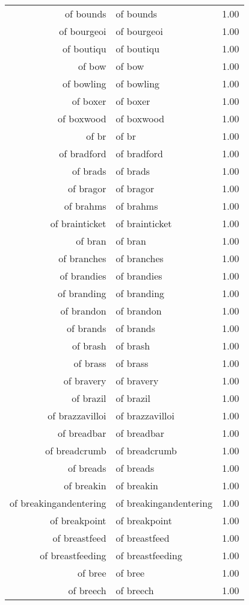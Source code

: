 \begin{table}[ht]
\begin{tabular}{rlr}
  of bounds & of bounds & 1.00 \\ 
  of bourgeoi & of bourgeoi & 1.00 \\ 
  of boutiqu & of boutiqu & 1.00 \\ 
  of bow & of bow & 1.00 \\ 
  of bowling & of bowling & 1.00 \\ 
  of boxer & of boxer & 1.00 \\ 
  of boxwood & of boxwood & 1.00 \\ 
  of br & of br & 1.00 \\ 
  of bradford & of bradford & 1.00 \\ 
  of brads & of brads & 1.00 \\ 
  of bragor & of bragor & 1.00 \\ 
  of brahms & of brahms & 1.00 \\ 
  of brainticket & of brainticket & 1.00 \\ 
  of bran & of bran & 1.00 \\ 
  of branches & of branches & 1.00 \\ 
  of brandies & of brandies & 1.00 \\ 
  of branding & of branding & 1.00 \\ 
  of brandon & of brandon & 1.00 \\ 
  of brands & of brands & 1.00 \\ 
  of brash & of brash & 1.00 \\ 
  of brass & of brass & 1.00 \\ 
  of bravery & of bravery & 1.00 \\ 
  of brazil & of brazil & 1.00 \\ 
  of brazzavilloi & of brazzavilloi & 1.00 \\ 
  of breadbar & of breadbar & 1.00 \\ 
  of breadcrumb & of breadcrumb & 1.00 \\ 
  of breads & of breads & 1.00 \\ 
  of breakin & of breakin & 1.00 \\ 
  of breakingandentering & of breakingandentering & 1.00 \\ 
  of breakpoint & of breakpoint & 1.00 \\ 
  of breastfeed & of breastfeed & 1.00 \\ 
  of breastfeeding & of breastfeeding & 1.00 \\ 
  of bree & of bree & 1.00 \\ 
  of breech & of breech & 1.00 \\ 

\end{tabular}
\end{table}
